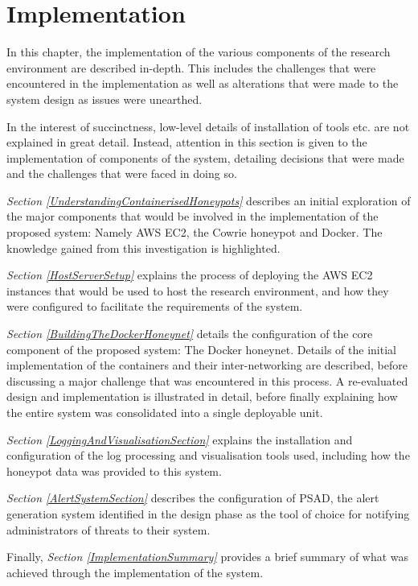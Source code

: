 \chapter{Implementation} \label{Chapter5}
In this chapter, the implementation of the various components of the research environment are described in-depth. This includes the challenges that were encountered in the implementation as well as alterations that were made to the system design as issues were unearthed.

In the interest of succinctness, low-level details of installation of tools etc. are not explained in great detail. Instead, attention in this section is given to the implementation of components of the system, detailing decisions that were made and the challenges that were faced in doing so.

\textit{Section \ref{UnderstandingContainerisedHoneypots}} describes an initial exploration of the major components that would be involved in the implementation of the proposed system: Namely AWS EC2, the Cowrie honeypot and Docker. The knowledge gained from this investigation is highlighted. 

\textit{Section \ref{HostServerSetup}} explains the process of deploying the AWS EC2 instances that would be used to host the research environment, and how they were configured to facilitate the requirements of the system.

\textit{Section \ref{BuildingTheDockerHoneynet}} details the configuration of the core component of the proposed system: The Docker honeynet. Details of the initial implementation of the containers and their inter-networking are described, before discussing a major challenge that was encountered in this process. A re-evaluated design and implementation is illustrated in detail, before finally explaining how the entire system was consolidated into a single deployable unit.

\textit{Section \ref{LoggingAndVisualisationSection}} explains the installation and configuration of the log processing and visualisation tools used, including how the honeypot data was provided to this system.

\textit{Section \ref{AlertSystemSection}} describes the configuration of PSAD, the alert generation system identified in the design phase as the tool of choice for notifying administrators of threats to their system.

Finally, \textit{Section \ref{ImplementationSummary}} provides a brief summary of what was achieved through the implementation of the system.



